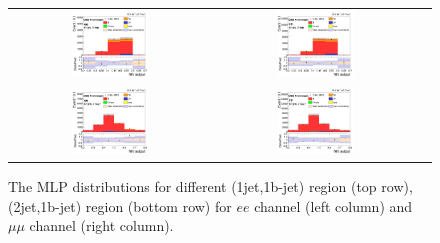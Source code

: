 \begin{figure}[ht]
  \begin{center}
    \begin{tabular}{ccc}
      \includegraphics[width=0.4\textwidth]{figures/tW/fig/tW_result/Result/ee/H_MLP_1jet_1bjet.png} &
      \includegraphics[width=0.4\textwidth]{figures/tW/fig/tW_result/Result/mumu/H_MLP_1jet_1bjet.png}\\
      \includegraphics[width=0.4\textwidth]{figures/tW/fig/tW_result/Result/ee/H_MLP_2jet_1bjet.png} &
      \includegraphics[width=0.4\textwidth]{figures/tW/fig/tW_result/Result/mumu/H_MLP_2jet_1bjet.png}\\
    \end{tabular}
    \caption{The MLP distributions for different (1jet,1b-jet)  region (top row), (2jet,1b-jet) region (bottom row) for $ee$ channel (left column) and $\mu\mu$ channel (right column).
    \label{fig:limit_MLP}}
  \end{center}
\end{figure}

